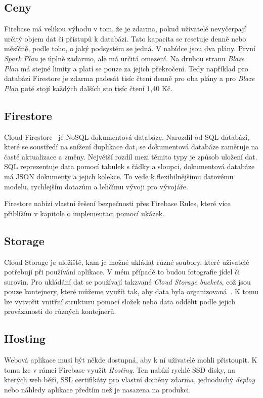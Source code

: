 \subsection{Ceny}
Firebase má velikou výhodu v tom, že je zdarma, pokud uživatelé nevyčerpají určitý objem dat či přístupů k databázi. Tato kapacita se resetuje
denně nebo měsíčně, podle toho, o jaký podsystém se jedná. V nabídce jsou dva plány. První \emph{Spark Plan} je úplně zadarmo, ale má určitá omezení.
Na druhou stranu \emph{Blaze Plan} má stejné limity a platí se pouze za jejich překročení. Tedy například pro databázi Firestore je zdarma padesát tisíc
čtení denně pro oba plány a pro \emph{Blaze Plan} poté stojí každých dalších sto tisíc čtení 1,40 Kč.~\cite{FirebasePricing}

\subsection{Firestore}
Cloud Firestore~\cite{Firestore} je NoSQL dokumentová databáze. Narozdíl od SQL databází, které se soustředí na snížení duplikace dat, se dokumentová
databáze zaměruje na časté aktualizace a změny. Největší rozdíl mezi těmito typy je způsob uložení dat. SQL reprezentuje data pomocí
tabulek s řádky a sloupci, dokumentová databáze má JSON dokumenty a jejich kolekce. To vede k flexibilnějšímu datovému modelu, rychlejším
dotazům a lehčímu vývoji pro vývojáře.~\cite{MongoDBNoSQL}

Firestore nabízí vlastní řešení bezpečnosti přes Firebase Rules, které více přiblížím v kapitole o implementaci pomocí ukázek.

\subsection{Storage}
Cloud Storage je uložiště, kam je možné ukládat různé soubory, které uživatelé potřebují při používání aplikace. V mém případě to
budou fotografie jídel či surovin. Pro ukládání dat se používají takzvané \emph{Cloud Storage buckets}, což jsou pouze kontejnery,
které můžeme využít tak, aby data byla organizovaná~\cite{FirebaseBucket}. K tomu lze vytvořit vnitřní strukturu pomocí složek nebo
data oddělit podle jejich provázanosti do různých kontejnerů.

\subsection{Hosting}
Webová aplikace musí být někde dostupná, aby k ní uživatelé mohli přistoupit. K tomu lze v rámci Firebase využít \emph{Hosting}.
Ten nabízí rychlé SSD disky, na kterých web běží, SSL certifikáty pro vlastní domény zdarma, jednoduchý \emph{deploy} nebo náhledy
aplikace předtím než je nasazena na produkci.~\cite{FirebaseHosting}

